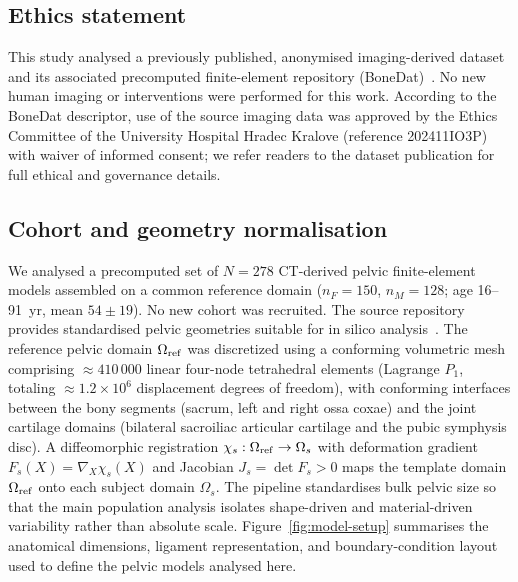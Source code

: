 \documentclass[11pt]{article}
\begin{document}
\subsection{Ethics statement}

This study analysed a previously published, anonymised imaging-derived dataset and its associated precomputed finite-element repository (BoneDat)~\citep{HenyssKuchar2025BoneDat}.
No new human imaging or interventions were performed for this work.
According to the BoneDat descriptor, use of the source imaging data was approved by the Ethics Committee of the University Hospital Hradec Kralove (reference 202411IO3P) with waiver of informed consent; we refer readers to the dataset publication for full ethical and governance details.

\subsection{Cohort and geometry normalisation}
\label{sec:cohort}

We analysed a precomputed set of $N{=}278$ CT-derived pelvic finite-element models assembled on a common reference domain ($n_F{=}150$, $n_M{=}128$; age 16--91~yr, mean $54\pm19$).
No new cohort was recruited.
The source repository provides standardised pelvic geometries suitable for in silico analysis~\citep{HenyssKuchar2025BoneDat}.
The reference pelvic domain $\Omega_{\rm ref}$ was discretized using a conforming volumetric mesh comprising $\approx 410\,000$ linear four-node tetrahedral elements (Lagrange $P_1$, totaling $\approx 1.2\times 10^6$ displacement degrees of freedom), with conforming interfaces between the bony segments (sacrum, left and right ossa coxae) and the joint cartilage domains (bilateral sacroiliac articular cartilage and the pubic symphysis disc).
A diffeomorphic registration $\chi_s: \Omega_{\rm ref}\to\Omega_s$ with deformation gradient $F_s(X)=\nabla_X\chi_s(X)$ and Jacobian $J_s=\det F_s>0$ maps the template domain $\Omega_{\rm ref}$ onto each subject domain $\Omega_s$.
The pipeline standardises bulk pelvic size so that the main population analysis isolates shape-driven and material-driven variability rather than absolute scale.
Figure~\ref{fig:model-setup} summarises the anatomical dimensions, ligament representation, and boundary-condition layout used to define the pelvic models analysed here.
\end{document}

